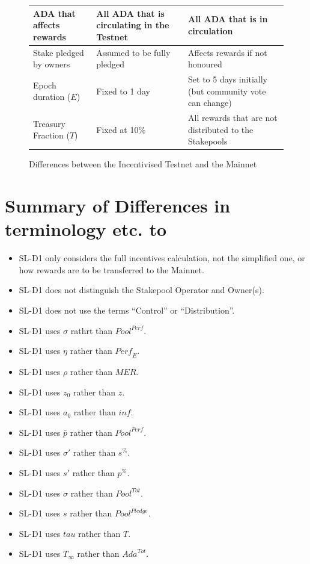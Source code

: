 \documentclass[11pt,a4paper,dvipsnames,twosided,final]{article}
\begin{document}
\begin{figure}[h!]
\begin{center}
\begin{tabular}{||l|p{4cm}|p{4cm}||}
ADA that affects rewards
& All ADA that is circulating in the Testnet
& All ADA that is in circulation
                                              \\\hline
Stake pledged by owners
& Assumed to be fully pledged
& %
Affects rewards if not honoured
                                              \\\hline
Epoch duration ($E$)
& Fixed to 1 day
& Set to 5 days initially (but community vote can change)
                                              \\\hline
Treasury Fraction ($T$)
& Fixed at 10\%
& All rewards that are not distributed to the Stakepools
                                              \\\hline
\hline
\end{tabular}
\end{center}
\caption{Differences between the Incentivised Testnet and the Mainnet}
\end{figure}

\clearpage



\appendix

\section{Summary of Differences in terminology etc. to \cite{delegation_design}}
\label{app:diffs}


\begin{itemize}
\item
  SL-D1 only considers the full incentives calculation, not the simplified one, or how
  rewards are to be transferred to the Mainnet.
\item
  SL-D1 does not distinguish the Stakepool Operator and Owner(s).
\item
  SL-D1 does not use the terms ``Control'' or ``Distribution''.
\item
  SL-D1 uses $\sigma$ rathrt than $\textit{Pool}^{\textit{Perf}}$.
\item
  SL-D1 uses $\eta$ rather than $\textit{Perf}_E$.
\item
  SL-D1 uses $\rho$ rather than $\textit{MER}$.
\item
  SL-D1 uses $z_0$ rather than $z$.
\item
  SL-D1 uses $a_0$ rather than $\textit{inf}$.
\item
  SL-D1 uses $\bar{p}$  rather than $\textit{Pool}^{\textit{Perf}}$.
\item
  SL-D1 uses $\sigma'$  rather than $\textit{s}^{\%}$.
\item
  SL-D1 uses $s'$  rather than $\textit{p}^{\%}$.
\item
  SL-D1 uses $\sigma$  rather than $\textit{Pool}^{\textit{Tot}}$.
\item
  SL-D1 uses $s$  rather than $\textit{Pool}^{\textit{Pledge}}$.
\item
  SL-D1 uses $tau$  rather than $T$.
\item
  SL-D1 uses $T_{\infty}$  rather than $\textit{Ada}^{Tot}$.
\end{itemize}
\end{document}
